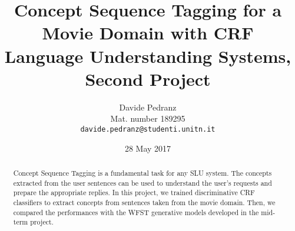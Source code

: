 \documentclass[11pt,a4paper]{article}
\title{
  Concept Sequence Tagging for a Movie Domain with CRF \\
  Language Understanding Systems, Second Project
}
\author{Davide Pedranz \\
  Mat. number 189295 \\
  {\tt davide.pedranz@studenti.unitn.it}
}
\date{28 May 2017}
\begin{document}
\maketitle

\begin{abstract}
Concept Sequence Tagging is a fundamental task for any \ac{SLU} system.
The concepts extracted from the user sentences can be used to understand the user's requests and prepare the appropriate replies.
In this project, we trained discriminative \ac{CRF} classifiers to extract concepts from sentences taken from the movie domain.
Then, we compared the performances with the \ac{WFST} generative models developed in the mid-term project.
\end{abstract}








\end{document}
